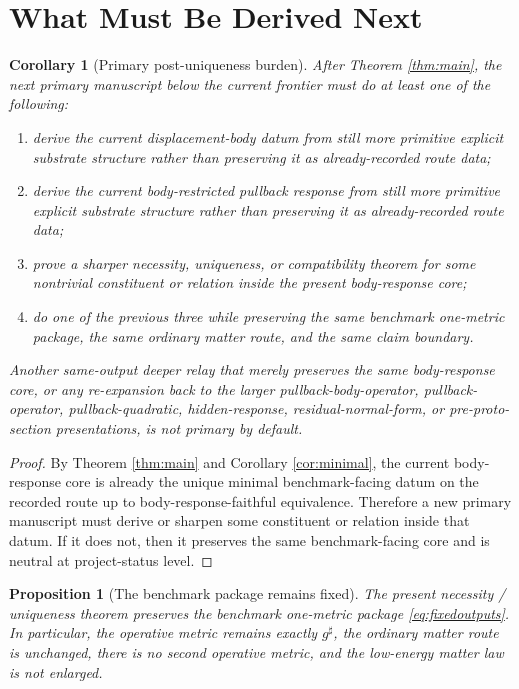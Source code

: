 \documentclass[11pt]{article}
\newcommand{\CompletedMetric}{g^{\sharp}}
\newtheorem{proposition}{Proposition}
\newtheorem{corollary}{Corollary}
\begin{document}
\section{What Must Be Derived Next}

\begin{corollary}[Primary post-uniqueness burden]
\label{cor:next}
After Theorem \ref{thm:main}, the next primary manuscript below the current frontier must do at least one of the following:
\begin{enumerate}
    \item derive the current displacement-body datum from still more primitive explicit substrate structure rather than preserving it as already-recorded route data;
    \item derive the current body-restricted pullback response from still more primitive explicit substrate structure rather than preserving it as already-recorded route data;
    \item prove a sharper necessity, uniqueness, or compatibility theorem for some nontrivial constituent or relation inside the present body-response core;
    \item do one of the previous three while preserving the same benchmark one-metric package, the same ordinary matter route, and the same claim boundary.
\end{enumerate}
Another same-output deeper relay that merely preserves the same body-response core, or any re-expansion back to the larger pullback-body-operator, pullback-operator, pullback-quadratic, hidden-response, residual-normal-form, or pre-proto-section presentations, is not primary by default.
\end{corollary}

\begin{proof}
By Theorem \ref{thm:main} and Corollary \ref{cor:minimal}, the current body-response core is already the unique minimal benchmark-facing datum on the recorded route up to body-response-faithful equivalence. Therefore a new primary manuscript must derive or sharpen some constituent or relation inside that datum. If it does not, then it preserves the same benchmark-facing core and is neutral at project-status level.
\end{proof}

\begin{proposition}[The benchmark package remains fixed]
\label{prop:benchmark}
The present necessity / uniqueness theorem preserves the benchmark one-metric package \eqref{eq:fixedoutputs}. In particular, the operative metric remains exactly \(\CompletedMetric\), the ordinary matter route is unchanged, there is no second operative metric, and the low-energy matter law is not enlarged.
\end{proposition}
\end{document}
